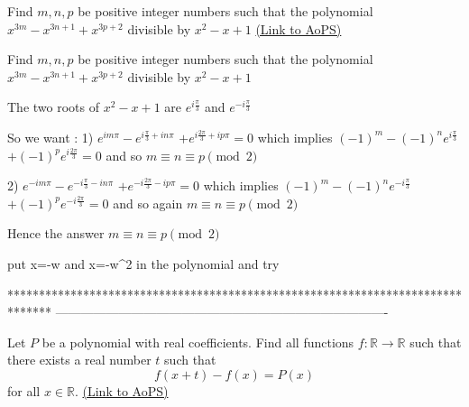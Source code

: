 \begin{problem}
	Find $m, n, p $ be positive integer numbers such that the polynomial $ x^{3m}-x^{3n+1}+x^{3p+2} $ divisible by $ x^2-x+1 $
	\flushright \href{https://artofproblemsolving.com/community/c6h469836}{(Link to AoPS)}
\end{problem}



\begin{solution}
	\begin{tcolorbox}Find $m, n, p $ be positive integer numbers such that the polynomial $ x^{3m}-x^{3n+1}+x^{3p+2} $ divisible by $ x^2-x+1 $\end{tcolorbox}
The two roots of $x^2-x+1$ are $e^{i\frac{\pi}3}$ and $e^{-i\frac{\pi}3}$

So we want : 
1) $e^{im\pi}-e^{i\frac{\pi}3+in\pi}$ $+e^{i\frac{2\pi}3+ip\pi}=0$
which implies  $(-1)^m-(-1)^ne^{i\frac{\pi}3}$ $+(-1)^pe^{i\frac{2\pi}3}=0$ and so $m\equiv n\equiv p\pmod 2$


2) $e^{-im\pi}-e^{-i\frac{\pi}3-in\pi}$ $+e^{-i\frac{2\pi}3-ip\pi}=0$
which implies  $(-1)^m-(-1)^ne^{-i\frac{\pi}3}$ $+(-1)^pe^{-i\frac{2\pi}3}=0$ and so again $m\equiv n\equiv p\pmod 2$

Hence the answer $\boxed{m\equiv n\equiv p\pmod 2}$
\end{solution}



\begin{solution}
	put x=-w and x=-w^2 in the polynomial and try
\end{solution}
*******************************************************************************
-------------------------------------------------------------------------------

\begin{problem}
	Let $P$ be a polynomial with real coefficients. Find all functions $f : \mathbb{R} \rightarrow \mathbb{R}$ such that there exists a real number $t$ such that
\[f(x+t) - f(x) = P(x)\]
for all $x \in \mathbb{R}$.
	\flushright \href{https://artofproblemsolving.com/community/c6h470219}{(Link to AoPS)}
\end{problem}



